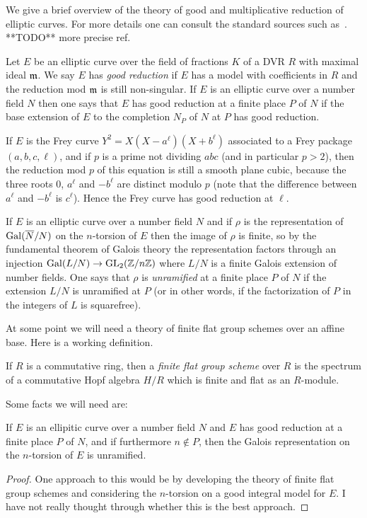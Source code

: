 We give a brief overview of the theory of good and multiplicative reduction of elliptic curves.
For more details one can consult the standard sources such as~\cite{silverman}. **TODO** more
precise ref.

Let $E$ be an elliptic curve over the field of fractions $K$ of a DVR 
$R$ with maximal ideal $\mathfrak{m}$. We say $E$ has \emph{good reduction} if $E$ has a model with 
coefficients in $R$ and the reduction mod $\mathfrak{m}$ is still non-singular. If $E$ is an elliptic curve 
over a number field $N$ then one says that $E$ has good reduction at a finite place $P$ of $N$ if 
the base extension of $E$ to the completion $N_P$ of $N$ at $P$ has good reduction.

\begin{example} If $E$ is the Frey curve $Y^2=X(X-a^\ell)(X+b^\ell)$ associated to a
  Frey package $(a,b,c,\ell)$, and if $p$ is a prime
  not dividing $abc$ (and in particular $p>2$), then the reduction mod $p$ of this 
  equation is still a smooth
  plane cubic, because the three roots $0$, $a^\ell$ and $-b^\ell$ are distinct modulo $p$
  (note that the difference between $a^\ell$ and $-b^\ell$ is $c^\ell$). Hence the Frey curve
  has good reduction at $\ell$.
\end{example}

If $E$ is an elliptic curve over a number field $N$ and if $\rho$ is the representation
of $\operatorname{Gal}(\overline{N}/N)$ on the $n$-torsion of $E$ then the image of $\rho$ is finite,
so by the fundamental theorem of Galois theory the representation factors through an
injection $\operatorname{Gal}(L/N)\to\operatorname{GL}_2(\mathbb{Z}/n\mathbb{Z})$ where $L/N$ is a finite Galois extension of
number fields. One says that $\rho$ is \emph{unramified} at a finite place $P$ of $N$
if the extension $L/N$ is unramified at $P$ (or in other words, if the factorization
of $P$ in the integers of $L$ is squarefree).

At some point we will need a theory of finite flat group schemes over an affine base. Here
is a working definition.

\begin{definition}\label{finite_flat_group_scheme} If $R$ is a commutative ring, then
  a \emph{finite flat group scheme} over $R$ is the spectrum of a commutative Hopf algebra $H/R$ 
  which is finite and flat as an $R$-module.
\end{definition}

Some facts we will need are:

\begin{theorem}\label{good_reduction_implies_unramified} If $E$ is an ellipitic curve over a number 
  field $N$ and $E$ has good reduction at a finite place $P$ of $N$, and if furthermore 
  $n\not\in P$, then the Galois representation on the $n$-torsion of $E$ is unramified.
\end{theorem}
\begin{proof}
  One approach to this would be by developing the theory of finite flat group schemes
  and considering the $n$-torsion on a good integral model for $E$. I have not really thought
  through whether this is the best approach. 
\end{proof}


